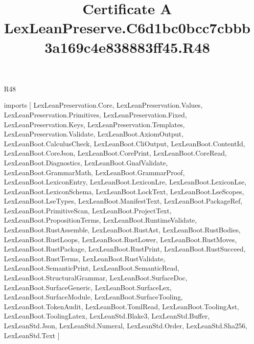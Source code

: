 \begin{lexlean}{R48}
\title{Certificate A LexLeanPreserve.C6d1bc0bcc7cbbb3a169c4e838883ff45.R48}
\begin{coremodule}
imports [
  LexLeanPreservation.Core,
  LexLeanPreservation.Values,
  LexLeanPreservation.Primitives,
  LexLeanPreservation.Fixed,
  LexLeanPreservation.Keys,
  LexLeanPreservation.Templates,
  LexLeanPreservation.Validate,
  LexLeanBoot.AxiomOutput,
  LexLeanBoot.CalculusCheck,
  LexLeanBoot.CliOutput,
  LexLeanBoot.ContentId,
  LexLeanBoot.CoreJson,
  LexLeanBoot.CorePrint,
  LexLeanBoot.CoreRead,
  LexLeanBoot.Diagnostics,
  LexLeanBoot.GnafValidate,
  LexLeanBoot.GrammarMath,
  LexLeanBoot.GrammarProof,
  LexLeanBoot.LexiconEntry,
  LexLeanBoot.LexiconLre,
  LexLeanBoot.LexiconLse,
  LexLeanBoot.LexiconSchema,
  LexLeanBoot.LockText,
  LexLeanBoot.LseScopes,
  LexLeanBoot.LseTypes,
  LexLeanBoot.ManifestText,
  LexLeanBoot.PackageRef,
  LexLeanBoot.PrimitiveScan,
  LexLeanBoot.ProjectText,
  LexLeanBoot.PropositionTerms,
  LexLeanBoot.RuntimeValidate,
  LexLeanBoot.RustAssemble,
  LexLeanBoot.RustAst,
  LexLeanBoot.RustBodies,
  LexLeanBoot.RustLoops,
  LexLeanBoot.RustLower,
  LexLeanBoot.RustMoves,
  LexLeanBoot.RustPackage,
  LexLeanBoot.RustPrint,
  LexLeanBoot.RustSucceed,
  LexLeanBoot.RustTerms,
  LexLeanBoot.RustValidate,
  LexLeanBoot.SemanticPrint,
  LexLeanBoot.SemanticRead,
  LexLeanBoot.StructuralGrammar,
  LexLeanBoot.SurfaceDoc,
  LexLeanBoot.SurfaceGeneric,
  LexLeanBoot.SurfaceLex,
  LexLeanBoot.SurfaceModule,
  LexLeanBoot.SurfaceTooling,
  LexLeanBoot.TokenAudit,
  LexLeanBoot.TomlRead,
  LexLeanBoot.ToolingAst,
  LexLeanBoot.ToolingLatex,
  LexLeanStd.Blake3,
  LexLeanStd.Buffer,
  LexLeanStd.Json,
  LexLeanStd.Numeral,
  LexLeanStd.Order,
  LexLeanStd.Sha256,
  LexLeanStd.Text
]


\end{coremodule}
\end{lexlean}
